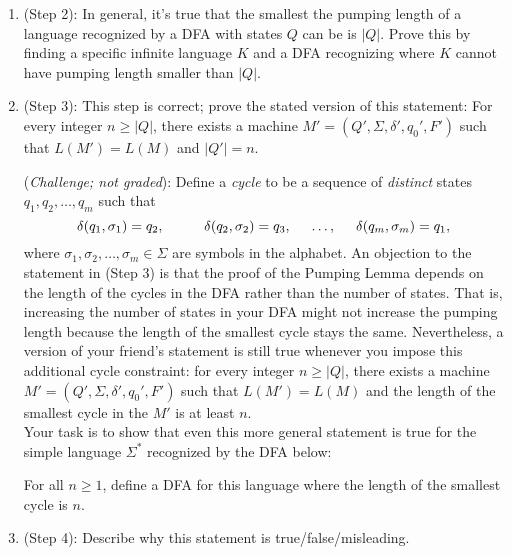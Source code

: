 \begin{enumerate}
\begin{enumerate}
    \item\gradeComplete (Step 2): 
    In general, it's true that the smallest the pumping length of a language
    recognized by a DFA with states $Q$ can be is $|Q|$. Prove this by finding a specific infinite language $K$ and a DFA recognizing 
    where $K$ cannot have pumping length smaller than $|Q|$.

    \item\gradeComplete (Step 3): This step is correct;
    prove the stated version of this statement: For every integer $n \ge |Q|$, there 
    exists a machine $M' = (Q', \Sigma, \delta', q_0', F')$ such that $L(M') = L(M)$ and $|Q'| = n$.

    (\textit{Challenge; not graded}): 
    Define a \emph{cycle} to be a sequence of \emph{distinct} states $q_1, q_2, \ldots, q_m$ such that
	\[
	\delta(q_1, \sigma_1) = q_2, \hspace{1cm} \delta(q_2, \sigma_2) = q_3, \hspace{.5cm} \ldots, \hspace{.5cm}\delta(q_m, \sigma_m) = q_1, 
	\]
	where $\sigma_1, \sigma_2, \ldots, \sigma_m \in \Sigma$ are symbols in the alphabet. 
    An objection to the statement in (Step 3) is that the proof of the Pumping Lemma 
    depends on the length of the cycles in the DFA rather than the number of states. That is, 
    increasing the number of states in your DFA might not increase the pumping length because 
    the length of the smallest cycle stays the same. Nevertheless, a version of your friend's statement 
    is still true whenever you impose this additional cycle constraint:  for every integer $n \ge |Q|$, 
    there exists a machine $M' = (Q', \Sigma, \delta', q_0', F')$ such that $L(M') = L(M)$ and the length 
    of the smallest cycle in the $M'$ is at least $n$. \\

	Your task is to show that even this more general statement is true for the simple language $\Sigma^*$ 
    recognized by the DFA below:
	\begin{center}
    \end{center}
	For all $n \ge 1$, define a DFA for this language where the length of the smallest cycle is $n$.

    \item\gradeComplete (Step 4): Describe why this statement is true/false/misleading.
\end{enumerate}


\end{enumerate}

